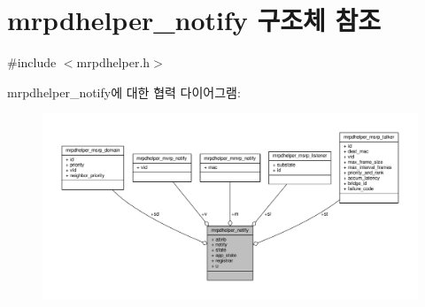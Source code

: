 \hypertarget{structmrpdhelper__notify}{}\section{mrpdhelper\+\_\+notify 구조체 참조}
\label{structmrpdhelper__notify}


{\ttfamily \#include $<$mrpdhelper.\+h$>$}



mrpdhelper\+\_\+notify에 대한 협력 다이어그램\+:
\nopagebreak
\begin{figure}[H]
\begin{center}
\leavevmode
\includegraphics[width=350pt]{structmrpdhelper__notify__coll__graph}
\end{center}
\end{figure}
